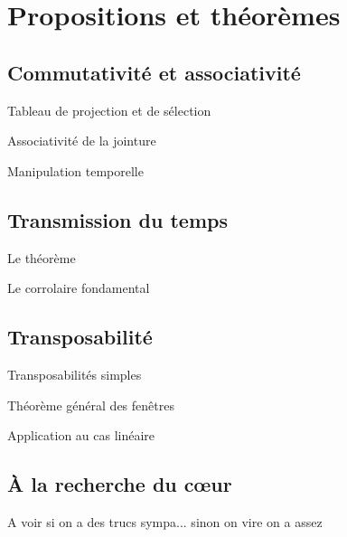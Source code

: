 \section{Propositions et théorèmes}
\subsection{Commutativité et associativité}
Tableau de projection et de sélection

Associativité de la jointure

Manipulation temporelle

\subsection{Transmission du temps}
Le théorème

Le corrolaire fondamental

\subsection{Transposabilité}
Transposabilités simples

Théorème général des fenêtres

Application au cas linéaire

\subsection{À la recherche du cœur}
A voir si on a des trucs sympa... sinon on vire on a assez